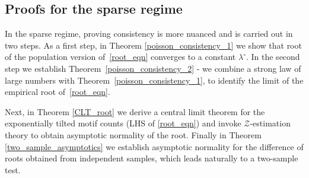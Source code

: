 \documentclass[12pt]{article}
\numberwithin{equation}{section}
\begin{document}
\subsection{Proofs for the sparse regime}

In the sparse regime, proving consistency is more nuanced and is carried out in two steps. As a first step, in Theorem \ref{poisson_consistency_1} we show that root of the population version of~\eqref{root_eqn} converges to a constant $\lambda^{\circ}$. In the second step we establish  Theorem~\ref{poisson_consistency_2} - we combine a strong law of large numbers with
    Theorem~\ref{poisson_consistency_1}, to identify the limit of the empirical root of~\eqref{root_eqn}.
    
    Next, in Theorem \ref{CLT_root} we derive a central
    limit theorem for the exponentially tilted motif counts (LHS of \eqref{root_eqn})  and invoke $\mathcal{Z}$-estimation
    theory to obtain asymptotic normality of the root.  Finally in Theorem \ref{two_sample_asymptotics} we establish asymptotic normality for the difference of roots obtained from independent samples, which leads naturally to a two-sample test.
\end{document}
